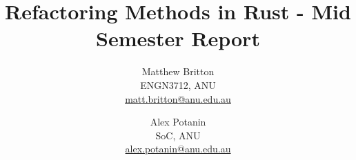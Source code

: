 \documentclass{sig-alternate-05-2015}
\begin{document}
\title{Refactoring Methods in Rust - Mid Semester Report}

\author{Matthew Britton\\ ENGN3712, ANU\\ \url{matt.britton@anu.edu.au} \and
Alex Potanin\\ SoC, ANU\\ \url{alex.potanin@anu.edu.au}}

\maketitle





\tableofcontents
\newpage
\listoffigures
\newpage
\listoftables
\newpage





\newpage



\end{document}
